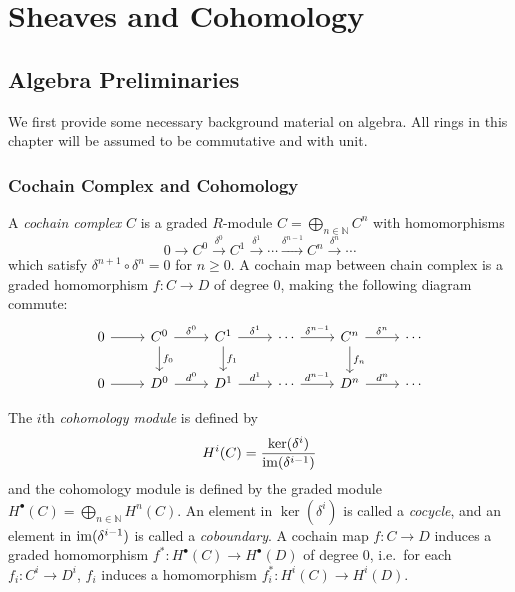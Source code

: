 \chapter{Sheaves and Cohomology}

\section{Algebra Preliminaries}

We first provide some necessary background material on algebra.
All rings in this chapter will be assumed to be commutative and with unit.

\subsection*{Cochain Complex and Cohomology}

\begin{defn}
    A \emph{cochain complex} $C$ is a graded $R$-module $C=\bigoplus_{n\in\mathbb{N}}C^n$ with homomorphisms
    \[0\to C^0\xrightarrow{\delta^0}C^1\xrightarrow{\delta^1}\cdots\xrightarrow{\delta^{n-1}}C^n\xrightarrow{\delta^n}\cdots\]
    which satisfy $\delta^{n+1}\circ\delta^n=0$ for $n\geq 0$.
    A cochain map between chain complex is a graded homomorphism $f:C\to D$ of degree $0$, making the following diagram commute:
    \[\begin{tikzcd}
        0 \ar[r] & C^0 \ar[d, "f_0"] \ar[r,"\delta^0"] & C^1 \ar[d, "f_1"] \ar[r,"\delta^1"] & \cdots \ar[r,"\delta^{n-1}"] & C^n \ar[d, "f_n"] \ar[r,"\delta^n"] & \cdots \\
        0 \ar[r] & D^0 \ar[r,"d^0"] & D^1 \ar[r,"d^1"] & \cdots \ar[r, "d^{n-1}"] & D^n \ar[r, "d^n"] & \cdots
    \end{tikzcd}\]
\end{defn}

\begin{defn}
    The $i$th \emph{cohomology module} is defined by
    \[H^i(C)=\frac{\ker(\delta^i)}{\operatorname{im}(\delta^{i-1})}\]
    and the cohomology module is defined by the graded module $H^\bullet(C)=\bigoplus_{n\in\mathbb{N}}H^n(C)$.
    An element in $\ker(\delta^i)$ is called a \emph{cocycle}, and an element in $\operatorname{im}(\delta^{i-1})$ is called a \emph{coboundary}.
    A cochain map $f:C\to D$ induces a graded homomorphism $f^*:H^\bullet(C)\to H^\bullet(D)$ of degree $0$, i.e.\ for each $f_i:C^i\to D^i$, $f_i$ induces a homomorphism $f^*_i:H^i(C)\to H^i(D)$.
\end{defn}

